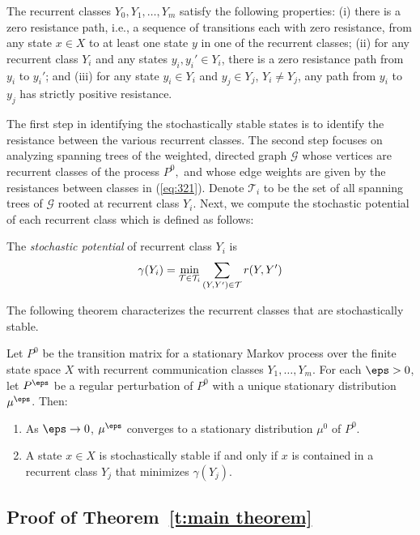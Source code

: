 The recurrent classes $Y_0,Y_1,\ldots,Y_m$ satisfy the following properties: (i) there is a zero resistance path, i.e., a sequence of transitions each with zero resistance, from any state $x \in X$ to at least one state $y$ in one of the recurrent classes; (ii) for any recurrent class $Y_i$ and any states $y_i,y_i' \in Y_i$, there is a zero resistance path from $y_i$ to $y_i'$; and (iii) for any state $y_i \in Y_i$ and $y_j \in Y_j$, $Y_i \neq Y_j$, any path from $y_i$ to $y_j$ has strictly positive resistance.  

The first step in identifying the stochastically stable states is to identify the resistance between the various recurrent classes.  %
The second step focuses on analyzing spanning trees of the weighted, directed graph $\mathcal{G}$ whose vertices are recurrent classes of the process $P^0,$ and whose edge weights are given by the resistances between classes in (\ref{eq:321}). Denote $\mathcal{T}_{i}$ to be the set of all spanning trees of $\mathcal{G}$ rooted at recurrent class $Y_i$. Next, we compute the stochastic potential of each recurrent class which is defined as follows:

%
\begin{defn}
The \emph{stochastic potential} of recurrent class $Y_i$ is 
\begin{equation*}
\gamma(Y_i) = \min_{{\cal T} \in \mathcal{T}_{i}} \sum_{(Y, Y')\in {\cal T}} r(Y,Y')
\end{equation*}
\end{defn}
%
The following theorem characterizes the recurrent classes that are stochastically stable.

\begin{Theorem} \label{t:Young Theorem}
Let $P^0$ be the transition matrix for a stationary Markov process over the finite state space $X$ with recurrent communication classes $Y_1,\ldots,Y_m$. For each $\eps > 0$, let $P^\eps$ be a regular perturbation of $P^0$ with a unique stationary distribution $\mu^\eps$. Then:
\begin{enumerate}
\item  As $\eps\to 0$, $\mu^\eps$ converges to a stationary distribution $\mu^0$ of $P^0.$
\item A state $x \in X$ is stochastically stable if and only if $x$ is contained in a recurrent class $Y_j$ that minimizes $\gamma(Y_j).$
\end{enumerate}
\end{Theorem}


\subsection{Proof of Theorem~\ref{t:main theorem}}\label{s:proof}

